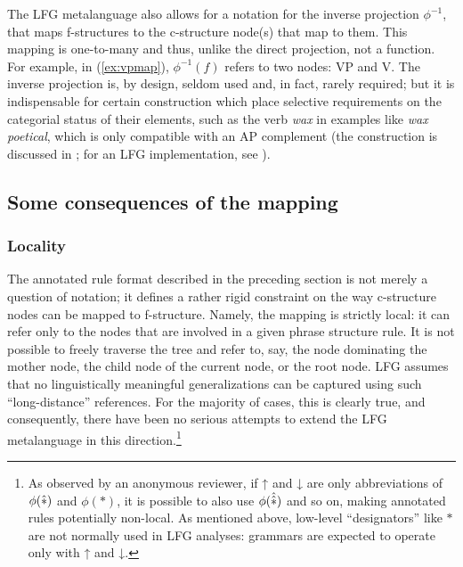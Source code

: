 \documentclass[output=paper,hidelinks]{langscibook}
\begin{document}
 \eas\label{ex:vpmap}
 \zs
 
 The LFG metalanguage also allows for a notation for the inverse projection $\phi^{-1}$, that maps f-structures to the c-structure node(s) that map to them. This mapping is one-to-many and thus, unlike the direct projection, not a function. For example, in (\ref{ex:vpmap}), $\phi^{-1}(f)$ refers to two nodes: VP and V. The inverse projection is, by design, seldom used and, in fact, rarely required; but it is indispensable for certain construction which place selective requirements on the categorial status of their elements, such as the verb \textit{wax} in examples like \textit{wax poetical}, which is only compatible with an AP complement (the construction is discussed in \cite{pollard1994head-driven}; for an LFG implementation, see \cite[6.10.3]{DLM:LFG}).
 
  \subsection{Some consequences of the mapping}
  
 \subsubsection{Locality}\label{sec:CoreConcepts:Locality}
 
 The annotated rule format described in the preceding section is not merely a question of notation; it defines a rather rigid constraint on the way c-structure nodes can be mapped to f-structure. Namely, the mapping is strictly local: it can refer only to the nodes that are involved in a given phrase structure rule. It is not possible to freely traverse the tree and refer to, say, the node dominating the mother node, the child node of the current node, or the root node. LFG assumes that no linguistically meaningful generalizations can be captured using such ``long-distance'' references. For the majority of cases, this is clearly true, and consequently, there have been no serious attempts to extend the LFG metalanguage in this direction.\footnote{As observed by an anonymous reviewer, if ↑ and ↓ are only abbreviations of $\phi(\hbox{$\hat{\ast}$})$ and $\phi(*)$, it is possible to also use $\phi(\hat{\hbox{$\hat{\ast}$}})$ and so on, making annotated rules potentially non-local. As mentioned above, low-level ``designators'' like $*$ are not normally used in LFG analyses: grammars are expected to operate only with ↑ and ↓.}
 
\end{document}
